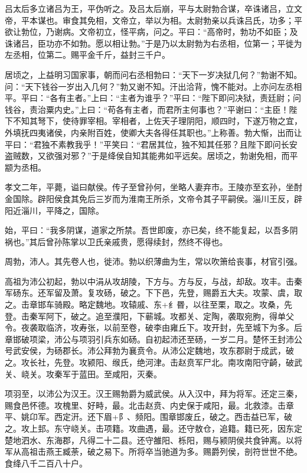 \documentclass[12pt,UTF8]{ctexbook}
\begin{document}
吕太后多立诸吕为王，平伪听之。及吕太后崩，平与太尉勃合谋，卒诛诸吕，立文帝，平本谋也。审食其免相，文帝立，举以为相。太尉勃亲以兵诛吕氏，功多；平欲让勃位，乃谢病。文帝初立，怪平病，问之。平曰：“高帝时，勃功不如臣；及诛诸吕，臣功亦不如勃。愿以相让勃。”于是乃以太尉勃为右丞相，位第一；平徙为左丞相，位第二。赐平金千斤，益封三千户。



居顷之，上益明习国家事，朝而问右丞相勃曰：“天下一岁决狱几何？”勃谢不知。问：“天下钱谷一岁出入几何？”勃又谢不知。汗出洽背，愧不能对。上亦问左丞相平。平曰：“各有主者。”上曰：“主者为谁乎？”平曰：“陛下即问决狱，责廷尉；问钱谷，责治粟内史。”上曰：“苟各有主者，而君所主何事也？”平谢曰：“主臣！陛下不知其弩下，使待罪宰相。宰相者，上佐天子理阴阳，顺四时，下遂万物之宜，外填抚四夷诸侯，内亲附百姓，使卿大夫各得任其职也。”上称善。勃大惭，出而让平曰：“君独不素教我乎！”平笑曰：“君居其位，独不知其任邪？且陛下即问长安盗贼数，又欲强对邪？”于是绛侯自知其能弗如平远矣。居顷之，勃谢免相，而平颛为丞相。



孝文二年，平薨，谥曰献侯。传子至曾孙何，坐略人妻弃市。王陵亦至玄孙，坐酎金国除。辟阳侯食其免后三岁而为淮南王所杀，文帝令其子平嗣侯。淄川王反，辟阳近淄川，平降之，国除。



始，平曰：“我多阴谋，道家之所禁。吾世即废，亦已矣，终不能复起，以吾多阴祸也。”其后曾孙陈掌以卫氏亲戚贵，愿得续封，然终不得也。



周勃，沛人。其先卷人也，徙沛。勃以织薄曲为生，常以吹箫给丧事，材官引强。



高祖为沛公初起，勃以中涓从攻胡陵，下方与。方与反，与战，却敌。攻丰。击秦军砀东。还军留及萧。复攻砀，破之。下下邑，先登，赐爵五大夫。攻蒙、虞，取之。击章邯车骑殿。略定魏地。攻辕戚、东+纟昬，以往至栗，取之。攻桑，先登。击秦军阿下，破之。追至濮阳，下蕲城。攻都关、定陶，袭取宛朐，得单父令。夜袭取临济，攻寿张，以前至卷，破李由雍丘下。攻开封，先至城下为多。后章邯破项梁，沛公与项羽引兵东如砀。自初起沛还至砀，一岁二月。楚怀王封沛公号武安侯，为砀郡长。沛公拜勃为襄贲令。从沛公定魏地，攻东郡尉于成武，破之。攻长社，先登。攻颍阳、缑氏，绝河津。击赵贲军尸北。南攻南阳守齮，破武关、峣关。攻秦军于蓝田。至咸阳，灭秦。



项羽至，以沛公为汉王。汉王赐勃爵为威武侯。从入汉中，拜为将军。还定三秦，赐食邑怀德。攻槐里、好畤，最。北击赵贲、内史保于咸阳，最。北救漆。击章平、姚卬军。西定汧。还下眉+阝、频阳。围章邯废丘，破之。西击益已军，破之。攻上邽。东守峣关。击项籍。攻曲遇，最。还守敖仓，追籍。籍已死，因东定楚地泗水、东海郡，凡得二十二县。还守雒阳、栎阳，赐与颍阴侯共食钟离。以将军从高祖击燕王臧荼，破之易下。所将卒当驰道为多。赐爵列侯，剖符世世不绝。食绛八千二百八十户。
\end{document}
